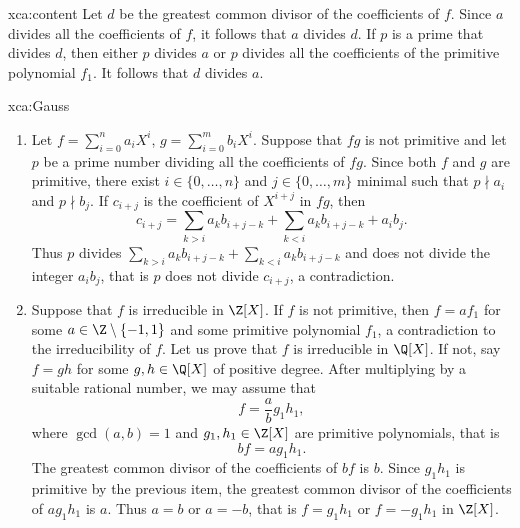 \begin{sol}{xca:content}
	Let $d$ be 
	the greatest common divisor
	of the coefficients of $f$. 
	Since $a$ divides all the coefficients of $f$, it follows that $a$ divides $d$. If $p$ is a prime that
	divides $d$, then either $p$ divides $a$ or $p$ divides all the coefficients of the primitive
	polynomial $f_1$. It follows that $d$ divides $a$.    
\end{sol}

\begin{sol}{xca:Gauss}\
\begin{enumerate}
	\item Let $f=\sum_{i=0}^na_iX^i$, $g=\sum_{i=0}^mb_iX^i$. Suppose that 
	$fg$ is not primitive and let $p$ be a prime number dividing all the coefficients  
	of $fg$. Since both $f$ and $g$ are primitive, there exist $i\in\{0,\dots,n\}$ 
 	and $j\in\{0,\dots,m\}$ minimal such that $p\nmid a_i$ and $p\nmid b_j$. 
 	If $c_{i+j}$ is the coefficient of $X^{i+j}$ in $fg$, then  
	\[
 	c_{i+j}=\sum_{k>i}a_kb_{i+j-k}+\sum_{k<i}a_kb_{i+j-k}+a_ib_j.
 	\]
 	Thus $p$ divides $\sum_{k>i}a_kb_{i+j-k}+\sum_{k<i}a_kb_{i+j-k}$ and does not divide
 	the integer $a_ib_j$, that is $p$ does not divide $c_{i+j}$, a contradiction.
	\item Suppose that $f$ is irreducible in $\Z[X]$. If $f$ is not primitive, then
	$f=af_1$ for some $a\in\Z\setminus\{-1,1\}$ and some primitive polynomial $f_1$, a contradiction 
	to the irreducibility of $f$. Let us prove that $f$ is irreducible in $\Q[X]$. If not, say 
	$f=gh$ for some $g,h\in\Q[X]$ of positive degree. After multiplying by a 
	suitable rational number, we may assume that  
	\[
 	f=\frac{a}{b}g_1h_1,
 	\]
 	where $\gcd(a,b)=1$ and $g_1,h_1\in\Z[X]$ are primitive polynomials, that is 
 	\[
 	bf=ag_1h_1.
 	\]
 	The greatest common divisor of the coefficients of $bf$ is $b$. 
	Since $g_1h_1$ is primitive by the previous item, the greatest common divisor 
	of the coefficients of $ag_1h_1$ is $a$. Thus $a=b$ or $a=-b$, 
  	that is $f=g_1h_1$ or $f=-g_1h_1$ in $\Z[X]$.  
\end{enumerate}
\end{sol}

